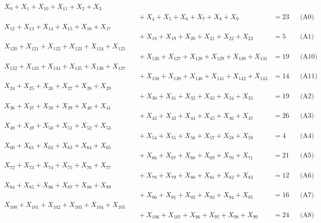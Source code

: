 \documentclass[a4paper,10pt]{article}
\begin{document}
\allowdisplaybreaks
{\small\begin{align}
X_{0} + X_{1} + X_{10} + X_{11} + X_{2} + X_{3} \\[0.5ex]
&\quad  + X_{4} + X_{5} + X_{6} + X_{7} + X_{8} + X_{9} &= 23 && \text{(A0)} \\
X_{12} + X_{13} + X_{14} + X_{15} + X_{16} + X_{17} \\[0.5ex]
&\quad  + X_{18} + X_{19} + X_{20} + X_{21} + X_{22} + X_{23} &= 5 && \text{(A1)} \\
X_{120} + X_{121} + X_{122} + X_{123} + X_{124} + X_{125} \\[0.5ex]
&\quad  + X_{126} + X_{127} + X_{128} + X_{129} + X_{130} + X_{131} &= 19 && \text{(A10)} \\
X_{132} + X_{133} + X_{134} + X_{135} + X_{136} + X_{137} \\[0.5ex]
&\quad  + X_{138} + X_{139} + X_{140} + X_{141} + X_{142} + X_{143} &= 14 && \text{(A11)} \\
X_{24} + X_{25} + X_{26} + X_{27} + X_{28} + X_{29} \\[0.5ex]
&\quad  + X_{30} + X_{31} + X_{32} + X_{33} + X_{34} + X_{35} &= 19 && \text{(A2)} \\
X_{36} + X_{37} + X_{38} + X_{39} + X_{40} + X_{41} \\[0.5ex]
&\quad  + X_{42} + X_{43} + X_{44} + X_{45} + X_{46} + X_{47} &= 26 && \text{(A3)} \\
X_{48} + X_{49} + X_{50} + X_{51} + X_{52} + X_{53} \\[0.5ex]
&\quad  + X_{54} + X_{55} + X_{56} + X_{57} + X_{58} + X_{59} &= 4 && \text{(A4)} \\
X_{60} + X_{61} + X_{62} + X_{63} + X_{64} + X_{65} \\[0.5ex]
&\quad  + X_{66} + X_{67} + X_{68} + X_{69} + X_{70} + X_{71} &= 21 && \text{(A5)} \\
X_{72} + X_{73} + X_{74} + X_{75} + X_{76} + X_{77} \\[0.5ex]
&\quad  + X_{78} + X_{79} + X_{80} + X_{81} + X_{82} + X_{83} &= 12 && \text{(A6)} \\
X_{84} + X_{85} + X_{86} + X_{87} + X_{88} + X_{89} \\[0.5ex]
&\quad  + X_{90} + X_{91} + X_{92} + X_{93} + X_{94} + X_{95} &= 16 && \text{(A7)} \\
X_{100} + X_{101} + X_{102} + X_{103} + X_{104} + X_{105} \\[0.5ex]
&\quad  + X_{106} + X_{107} + X_{96} + X_{97} + X_{98} + X_{99} &= 24 && \text{(A8)} \\

\end{align}}
\end{document}
